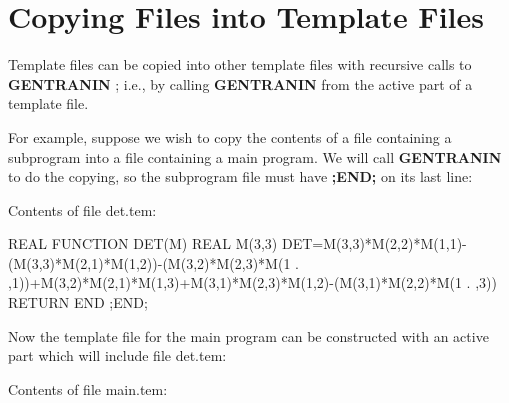 \section{Copying Files into Template Files}
\label{copy:template}

Template files can be copied into other template files with recursive calls
to {\bf GENTRANIN} ; i.e., by calling {\bf GENTRANIN} from the active part of a
template file.

For example, suppose we wish to copy the contents of a file containing
a subprogram into a file containing a main program.  We will call 
{\bf GENTRANIN} to do the copying, so the subprogram file must
have {\bf ;END;} on its last line:

Contents of file det.tem:
\begin{framedverbatim}
      REAL FUNCTION DET(M)                              
      REAL M(3,3)                                       
      DET=M(3,3)*M(2,2)*M(1,1)-(M(3,3)*M(2,1)*M(1,2))-(M(3,2)*M(2,3)*M(1
     . ,1))+M(3,2)*M(2,1)*M(1,3)+M(3,1)*M(2,3)*M(1,2)-(M(3,1)*M(2,2)*M(1
     . ,3))
      RETURN                                              
      END                                                 
;END;                                                     
\end{framedverbatim} 

Now the template file for the main program can be constructed
with an active part which will include file det.tem:

Contents of file main.tem:

